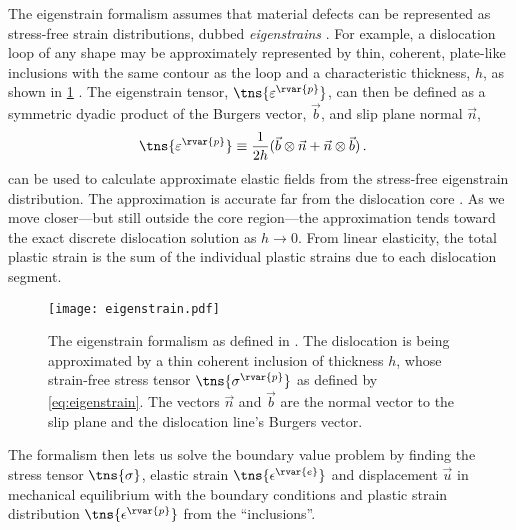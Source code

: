 The eigenstrain formalism assumes that material defects can be represented as stress-free strain distributions, dubbed \emph{eigenstrains} \cite{eigenstrain}. For example, a dislocation loop of any shape may be approximately represented by thin, coherent, plate-like inclusions with the same contour as the loop and a characteristic thickness, $ h $, as shown in \cref{f:eigenstrain} \cite{dcm}. The eigenstrain tensor, $ \tns{\varepsilon^{\rvar{p}}} $, can then be defined as a symmetric dyadic product of the Burgers vector, $ \vec{b} $, and slip plane normal $ \vec{n} $,
\begin{align}\label{eq:eigenstrain}
  \tns{\varepsilon^{\rvar{p}}} & \equiv \dfrac{1}{2h} (\vec{b} \otimes \vec{n} + \vec{n} \otimes \vec{b})\,.
\end{align}
 can be used to calculate approximate elastic fields from the stress-free eigenstrain distribution. The approximation is accurate far from the dislocation core \cite{dln_core}. As we move closer---but still outside the core region---the approximation tends toward the exact discrete dislocation solution as $ h \to 0$. From linear elasticity, the total plastic strain is the sum of the individual plastic strains due to each dislocation segment.
\begin{figure}
  \centering
  \texttt{[image: eigenstrain.pdf]}
  \caption[The eigenstrain formalism.]{The eigenstrain formalism as defined in \cite{eigenstrain}. The dislocation is being approximated by a thin coherent inclusion of thickness $ h $, whose strain-free stress tensor $ \tns{\sigma^{\rvar{p}}} $ as defined by \cref{eq:eigenstrain}. The vectors $ \vec{n} $ and $ \vec{b} $ are the normal vector to the slip plane and the dislocation line's Burgers vector.}
  \label{f:eigenstrain}
\end{figure}

The formalism then lets us solve the boundary value problem by finding the stress tensor $ \tns{\sigma} $, elastic strain $ \tns{\epsilon^{\rvar{e}}} $ and displacement $ \vec{u} $ in mechanical equilibrium with the boundary conditions and plastic strain distribution $ \tns{\epsilon^{\rvar{p}}} $ from the ``inclusions''.

